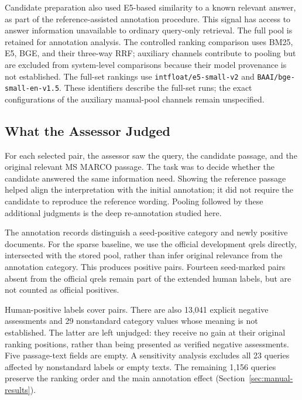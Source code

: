 \documentclass[runningheads,a4paper]{llncs}
\begin{document}
Candidate preparation also used E5-based similarity to a known relevant answer, as part of the reference-assisted annotation procedure. This signal has access to answer information unavailable to ordinary query-only retrieval. The full pool is retained for annotation analysis. The controlled ranking comparison uses BM25, E5, BGE, and their three-way RRF; auxiliary channels contribute to pooling but are excluded from system-level comparisons because their model provenance is not established. The full-set rankings use \texttt{intfloat/e5-small-v2} and \texttt{BAAI/bge-small-en-v1.5}. These identifiers describe the full-set runs; the exact configurations of the auxiliary manual-pool channels remain unspecified.

\subsection{What the Assessor Judged}
\label{sec:annotation}

For each selected pair, the assessor saw the query, the candidate passage, and the original relevant MS MARCO passage. The task was to decide whether the candidate answered the same information need. Showing the reference passage helped align the interpretation with the initial annotation; it did not require the candidate to reproduce the reference wording. Pooling followed by these additional judgments is the deep re-annotation studied here.

The annotation records distinguish a seed-positive category and newly positive documents. For the sparse baseline, we use the official development qrels directly, intersected with the stored pool, rather than infer original relevance from the annotation category. This produces \OriginalPositiveCount{} positive pairs. Fourteen seed-marked pairs absent from the official qrels remain part of the extended human labels, but are not counted as official positives.

Human-positive labels cover \HumanPositiveCount{} pairs. There are also 13,041 explicit negative assessments and 29 nonstandard category values whose meaning is not established. The latter are left unjudged: they receive no gain at their original ranking positions, rather than being presented as verified negative assessments. Five passage-text fields are empty. A sensitivity analysis excludes all 23 queries affected by nonstandard labels or empty texts. The remaining 1,156 queries preserve the ranking order and the main annotation effect (Section~\ref{sec:manual-results}).
\end{document}
